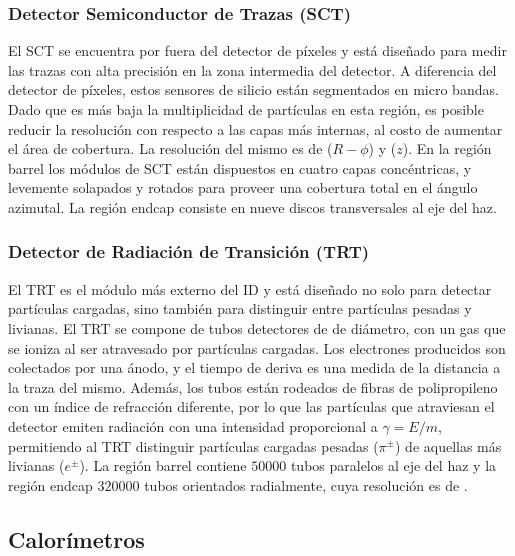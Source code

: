 \subsubsection{Detector Semiconductor de Trazas (SCT)}

El SCT se encuentra por fuera del detector de píxeles y está diseñado para medir las trazas con alta precisión en la zona intermedia del detector. A diferencia del detector de píxeles, estos sensores de silicio están segmentados en micro bandas. Dado que es más baja la multiplicidad de partículas en esta región, es posible reducir la resolución con respecto a las capas más internas, al costo de aumentar el área de cobertura. La resolución del mismo es de  ($R-\phi$) y  ($z$). En la región barrel los módulos de SCT están dispuestos en cuatro capas concéntricas, y levemente solapados y rotados para proveer una cobertura total en el ángulo azimutal. La región endcap consiste en nueve discos transversales al eje del haz.


\subsubsection{Detector de Radiación de Transición (TRT)}

El TRT es el módulo más externo del ID y está diseñado no solo para detectar partículas cargadas, sino también para distinguir entre partículas pesadas y livianas. El TRT se compone de tubos detectores de  de diámetro, con un gas que se ioniza al ser atravesado por partículas cargadas. Los electrones producidos son colectados por una ánodo, y el tiempo de deriva es una medida de la distancia a la traza del mismo. Además, los tubos están rodeados de fibras de polipropileno con un índice de refracción diferente, por lo que las partículas que atraviesan el detector emiten radiación con una intensidad proporcional a $\gamma=E/m$, permitiendo al TRT  distinguir partículas cargadas pesadas ($\pi^{\pm}$) de aquellas más livianas ($e^{\pm}$). La región barrel contiene $50000$ tubos paralelos al eje del haz y la región endcap $320000$ tubos orientados radialmente, cuya resolución es de .

\subsection{Calorímetros}


